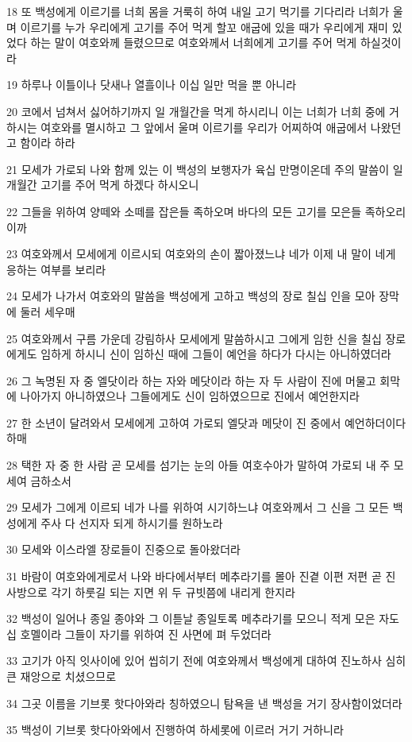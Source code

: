 \par 18 또 백성에게 이르기를 너희 몸을 거룩히 하여 내일 고기 먹기를 기다리라 너희가 울며 이르기를 누가 우리에게 고기를 주어 먹게 할꼬 애굽에 있을 때가 우리에게 재미 있었다 하는 말이 여호와께 들렸으므로 여호와께서 너희에게 고기를 주어 먹게 하실것이라
\par 19 하루나 이틀이나 닷새나 열흘이나 이십 일만 먹을 뿐 아니라
\par 20 코에서 넘쳐서 싫어하기까지 일 개월간을 먹게 하시리니 이는 너희가 너희 중에 거하시는 여호와를 멸시하고 그 앞에서 울며 이르기를 우리가 어찌하여 애굽에서 나왔던고 함이라 하라
\par 21 모세가 가로되 나와 함께 있는 이 백성의 보행자가 육십 만명이온데 주의 말씀이 일 개월간 고기를 주어 먹게 하겠다 하시오니
\par 22 그들을 위하여 양떼와 소떼를 잡은들 족하오며 바다의 모든 고기를 모은들 족하오리이까
\par 23 여호와께서 모세에게 이르시되 여호와의 손이 짧아졌느냐 네가 이제 내 말이 네게 응하는 여부를 보리라
\par 24 모세가 나가서 여호와의 말씀을 백성에게 고하고 백성의 장로 칠십 인을 모아 장막에 둘러 세우매
\par 25 여호와께서 구름 가운데 강림하사 모세에게 말씀하시고 그에게 임한 신을 칠십 장로에게도 임하게 하시니 신이 임하신 때에 그들이 예언을 하다가 다시는 아니하였더라
\par 26 그 녹명된 자 중 엘닷이라 하는 자와 메닷이라 하는 자 두 사람이 진에 머물고 회막에 나아가지 아니하였으나 그들에게도 신이 임하였으므로 진에서 예언한지라
\par 27 한 소년이 달려와서 모세에게 고하여 가로되 엘닷과 메닷이 진 중에서 예언하더이다 하매
\par 28 택한 자 중 한 사람 곧 모세를 섬기는 눈의 아들 여호수아가 말하여 가로되 내 주 모세여 금하소서
\par 29 모세가 그에게 이르되 네가 나를 위하여 시기하느냐 여호와께서 그 신을 그 모든 백성에게 주사 다 선지자 되게 하시기를 원하노라
\par 30 모세와 이스라엘 장로들이 진중으로 돌아왔더라
\par 31 바람이 여호와에게로서 나와 바다에서부터 메추라기를 몰아 진곁 이편 저편 곧 진 사방으로 각기 하룻길 되는 지면 위 두 규빗쯤에 내리게 한지라
\par 32 백성이 일어나 종일 종야와 그 이튿날 종일토록 메추라기를 모으니 적게 모은 자도 십 호멜이라 그들이 자기를 위하여 진 사면에 펴 두었더라
\par 33 고기가 아직 잇사이에 있어 씹히기 전에 여호와께서 백성에게 대하여 진노하사 심히 큰 재앙으로 치셨으므로
\par 34 그곳 이름을 기브롯 핫다아와라 칭하였으니 탐욕을 낸 백성을 거기 장사함이었더라
\par 35 백성이 기브롯 핫다아와에서 진행하여 하세롯에 이르러 거기 거하니라

